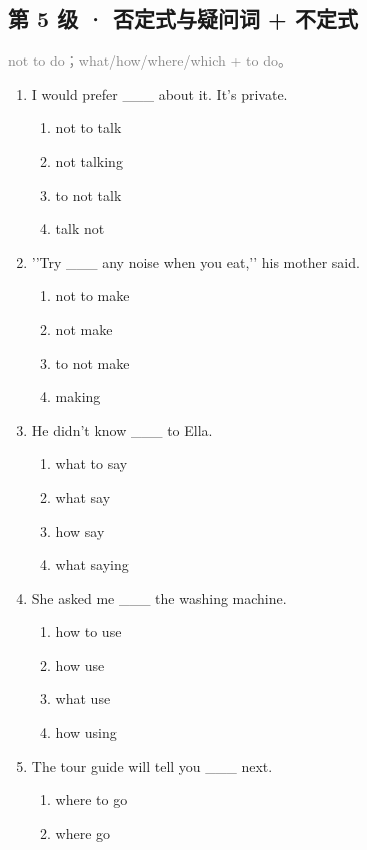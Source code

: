 \documentclass[11pt,a4paper]{ctexart}
\begin{document}
\subsection*{第 5 级 · 否定式与疑问词 + 不定式}
\noindent\textcolor{gray}{not to do；what/how/where/which + to do。}\par\smallskip
\begin{enumerate}[leftmargin=*,itemsep=4pt]
\item I would prefer \_\_\_ about it. It’s private.
\begin{enumerate}[label=\Alph*.,leftmargin=2em,itemsep=1pt,topsep=2pt]
\item not to talk
\item not talking
\item to not talk
\item talk not
\end{enumerate}
\item ’’Try \_\_\_ any noise when you eat,’’ his mother said.
\begin{enumerate}[label=\Alph*.,leftmargin=2em,itemsep=1pt,topsep=2pt]
\item not to make
\item not make
\item to not make
\item making
\end{enumerate}
\item He didn’t know \_\_\_ to Ella.
\begin{enumerate}[label=\Alph*.,leftmargin=2em,itemsep=1pt,topsep=2pt]
\item what to say
\item what say
\item how say
\item what saying
\end{enumerate}
\item She asked me \_\_\_ the washing machine.
\begin{enumerate}[label=\Alph*.,leftmargin=2em,itemsep=1pt,topsep=2pt]
\item how to use
\item how use
\item what use
\item how using
\end{enumerate}
\item The tour guide will tell you \_\_\_ next.
\begin{enumerate}[label=\Alph*.,leftmargin=2em,itemsep=1pt,topsep=2pt]
\item where to go
\item where go

\end{enumerate}
\end{enumerate}
\end{document}
